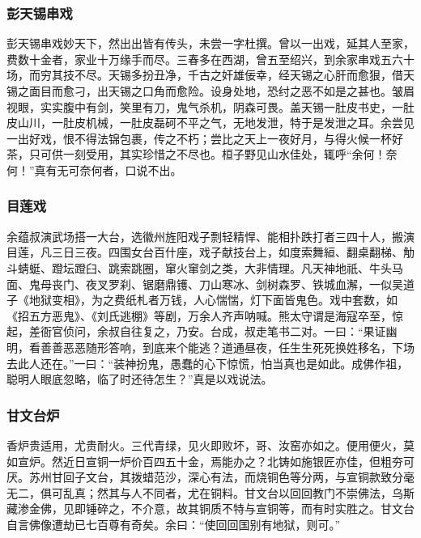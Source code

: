 \documentclass[]{article}
\begin{document}
\hypertarget{header-n434}{%
\subsubsection{彭天锡串戏}\label{header-n434}}

彭天锡串戏妙天下，然出出皆有传头，未尝一字杜撰。曾以一出戏，延其人至家，费数十金者，家业十万缘手而尽。三春多在西湖，曾五至绍兴，到余家串戏五六十场，而穷其技不尽。天锡多扮丑净，千古之奸雄佞幸，经天锡之心肝而愈狠，借天锡之面目而愈刁，出天锡之口角而愈险。设身处地，恐纣之恶不如是之甚也。皱眉视眼，实实腹中有剑，笑里有刀，鬼气杀机，阴森可畏。盖天锡一肚皮书史，一肚皮山川，一肚皮机械，一肚皮磊砢不平之气，无地发泄，特于是发泄之耳。余尝见一出好戏，恨不得法锦包裹，传之不朽；尝比之天上一夜好月，与得火候一杯好茶，只可供一刻受用，其实珍惜之不尽也。桓子野见山水佳处，辄呼``余何！奈何！''真有无可奈何者，口说不出。

\hypertarget{header-n439}{%
\subsubsection{目莲戏}\label{header-n439}}

余蕴叔演武场搭一大台，选徽州旌阳戏子剽轻精悍、能相扑跌打者三四十人，搬演目莲，凡三日三夜。四围女台百什座，戏子献技台上，如度索舞絙、翻桌翻梯、觔斗蜻蜓、蹬坛蹬臼、跳索跳圈，窜火窜剑之类，大非情理。凡天神地祇、牛头马面、鬼母丧门、夜叉罗刹、锯磨鼎镬、刀山寒冰、剑树森罗、铁城血澥，一似吴道子《地狱变相》，为之费纸札者万钱，人心惴惴，灯下面皆鬼色。戏中套数，如《招五方恶鬼》、《刘氏逃棚》等剧，万余人齐声呐喊。熊太守谓是海寇卒至，惊起，差衙官侦问，余叔自往复之，乃安。台成，叔走笔书二对。一曰：``果证幽明，看善善恶恶随形答响，到底来个能逃？道通昼夜，任生生死死换姓移名，下场去此人还在。''一曰：``装神扮鬼，愚蠢的心下惊慌，怕当真也是如此。成佛作祖，聪明人眼底忽略，临了时还待怎生？''真是以戏说法。

\hypertarget{header-n444}{%
\subsubsection{甘文台炉}\label{header-n444}}

香炉贵适用，尤贵耐火。三代青绿，见火即败坏，哥、汝窑亦如之。便用便火，莫如宣炉。然近日宣铜一炉价百四五十金，焉能办之？北铸如施银匠亦佳，但粗夯可厌。苏州甘回子文台，其拨蜡范沙，深心有法，而烧铜色等分两，与宣铜款致分毫无二，俱可乱真；然其与人不同者，尤在铜料。甘文台以回回教门不崇佛法，乌斯藏渗金佛，见即锤碎之，不介意，故其铜质不特与宣铜等，而有时实胜之。甘文台自言佛像遭劫已七百尊有奇矣。余曰：``使回回国别有地狱，则可。''
\end{document}
